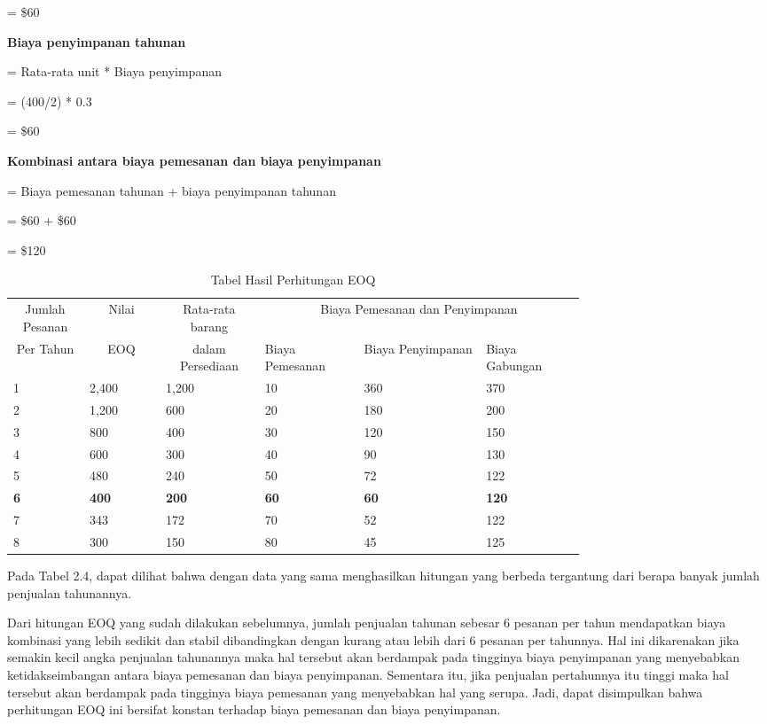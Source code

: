 = \${60}

\textbf{Biaya penyimpanan tahunan}

= Rata-rata unit * Biaya penyimpanan

= (400/2) * 0.3

= \${60}

\textbf{Kombinasi antara biaya pemesanan dan biaya penyimpanan}

= Biaya pemesanan tahunan + biaya penyimpanan tahunan

= \${60} + \${60}

= \${120}

\begin{table}[h!]
	\caption{Tabel Hasil Perhitungan EOQ}
	\label{tab:table4}
	\begin{tabular}{|m{0.1\linewidth}|m{0.1\linewidth}|m{0.13\linewidth}|m{0.13\linewidth}|m{0.16\linewidth}|m{0.13\linewidth}|} %
	\hline
	\multicolumn{1}{|c|}{Jumlah Pesanan} & \multicolumn{1}{|c|}{Nilai} & \multicolumn{1}{|c|}{Rata-rata barang} & \multicolumn{3}{c|}{Biaya Pemesanan dan Penyimpanan} \\
	\cline{4-6}
	\multicolumn{1}{|c|}{Per Tahun} & \multicolumn{1}{|c|}{EOQ} & \multicolumn{1}{|c|}{dalam Persediaan} & Biaya Pemesanan & Biaya Penyimpanan & Biaya Gabungan \\
	\hline
		1 & 2,400 & 1,200 & 10 & 360 & 370\\ \hline
		2 & 1,200 & 600 & 20 & 180 & 200\\ \hline
		3 & 800 & 400 & 30 & 120 & 150\\ \hline
		4 & 600 & 300 & 40 & 90 & 130\\ \hline
		5 & 480 & 240 & 50 & 72 & 122\\ \hline
		\textbf{6} & \textbf{400} & \textbf{200} & \textbf{60} & \textbf{60} & \textbf{120}\\ \hline
		7 & 343 & 172 & 70 & 52 & 122\\ \hline
		8 & 300 & 150 & 80 & 45 & 125\\ \hline
	\end{tabular}
\end{table}


Pada Tabel 2.4, dapat dilihat bahwa dengan data yang sama menghasilkan hitungan yang berbeda tergantung dari berapa banyak jumlah penjualan tahunannya.

Dari hitungan EOQ yang sudah dilakukan sebelumnya, jumlah penjualan tahunan sebesar 6 pesanan per tahun mendapatkan biaya kombinasi yang lebih sedikit dan stabil dibandingkan dengan kurang atau lebih dari 6 pesanan per tahunnya. Hal ini dikarenakan jika semakin kecil angka penjualan tahunannya maka hal tersebut akan berdampak pada tingginya biaya penyimpanan yang menyebabkan ketidakseimbangan antara biaya pemesanan dan biaya penyimpanan. Sementara itu, jika penjualan pertahunnya itu tinggi maka hal tersebut akan berdampak pada tingginya biaya pemesanan yang menyebabkan hal yang serupa. Jadi, dapat disimpulkan bahwa perhitungan EOQ ini bersifat konstan terhadap biaya pemesanan dan biaya penyimpanan.

